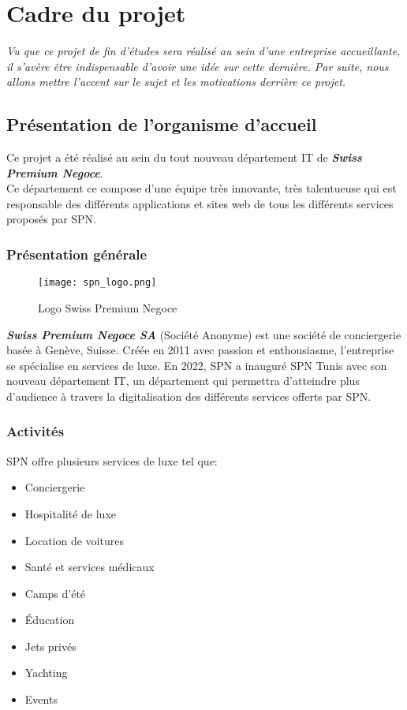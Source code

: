 \section{Cadre du projet}
\small{\textit{Vu que ce projet de fin d'études sera réalisé au sein d'une entreprise accueillante, il s'avère être indispensable d'avoir une idée sur cette dernière. Par suite, nous allons mettre l'accent sur le sujet et les motivations derrière ce projet.}}
\subsection{Présentation de l'organisme d'accueil}
Ce projet a été réalisé au sein du tout nouveau département IT de \textit{\textbf{Swiss Premium Negoce}}.\\
\noindent Ce département ce compose d'une équipe très innovante, très talentueuse qui est responsable des différents applications et sites web de tous les différents services proposés par SPN.
\subsubsection{Présentation générale}
\vspace{1cm}
\begin{figure}[H]
    \centering
    \texttt{[image: spn\_logo.png]}
    \vspace{0.5cm}
    \caption{Logo Swiss Premium Negoce}
    \label{fig:spn_logo}
\end{figure}
\vspace{1cm}
\textit{\textbf{Swiss Premium Negoce SA}} (Société Anonyme) est une société de conciergerie basée à
Genève, Suisse. Créée en 2011 avec passion et enthousiasme, l'entreprise se spécialise en services de luxe.
En 2022, SPN a inauguré SPN Tunis avec son nouveau département IT, un département qui permettra d'atteindre plus d'audience à travers la digitalisation des différents services offerts par SPN.
\subsubsection{Activités}
SPN offre plusieurs services de luxe tel que:
\begin{itemize}
    \item Conciergerie
    \item Hospitalité de luxe
    \item Location de voitures
    \item Santé et services médicaux
    \item Camps d'été
    \item Éducation
    \item Jets privés
    \item Yachting
    \item Events
\end{itemize}
